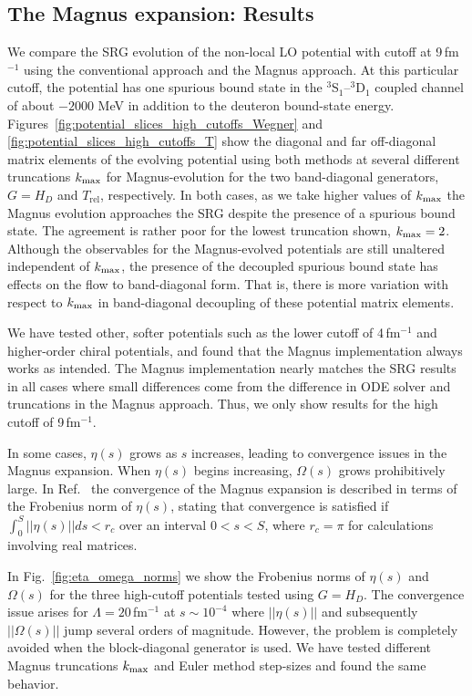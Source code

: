 \documentclass[10pt,aps,prc,floatfix,twocolumn,nofootinbib]{revtex4-1}
\newcommand{\Trel}{\ensuremath{T_{\textrm{rel}}}}
\begin{document}
\subsection{The Magnus expansion: Results}
\label{sec:magnus_expansion_results}


We compare the SRG evolution of the non-local LO potential with cutoff at 9\,fm$^{-1}$ using the conventional approach and the Magnus approach.
At this particular cutoff, the potential has one spurious bound state in the $^3$S$_1$--$^3$D$_1$ coupled channel of about $-2000$ MeV in addition to the deuteron bound-state energy. 
Figures~\ref{fig:potential_slices_high_cutoffs_Wegner} and \ref{fig:potential_slices_high_cutoffs_T} show the diagonal and far off-diagonal matrix elements of the evolving potential using both methods at several different truncations $k_{\rm max}$ for Magnus-evolution for the two band-diagonal generators, $G=H_D$ and \Trel, respectively.
In both cases, as we take higher values of $k_{\rm max}$ the Magnus evolution approaches the SRG despite the presence of a spurious bound state.
The agreement is rather poor for the lowest truncation shown, $k_{\rm max}=2$.
Although the observables for the Magnus-evolved potentials are still unaltered independent of $k_{\rm max}$, the presence of the decoupled spurious bound state has effects on the flow to band-diagonal form.
That is, there is more variation with respect to $k_{\rm max}$ in band-diagonal decoupling of these potential matrix elements.


We have tested other, softer potentials such as the lower cutoff of 4\,fm$^{-1}$ and higher-order chiral potentials, and found that the Magnus implementation always works as intended.
The Magnus implementation nearly matches the SRG results in all cases where small differences come from the difference in ODE solver and truncations in the Magnus approach.
Thus, we only show results for the high cutoff of 9\,fm$^{-1}$.


In some cases, $\eta(s)$ grows as $s$ increases, leading to convergence issues in the Magnus expansion.
When $\eta(s)$ begins increasing, $\Omega(s)$ grows prohibitively large.
In Ref.~\cite{Blanes:2009ab} the convergence of the Magnus expansion is described in terms of the Frobenius norm of $\eta(s)$, stating that convergence is satisfied if $\int_0^S ||\eta(s)|| ds < r_c$ over an interval $0 < s < S$, where $r_c = \pi$ for calculations involving real matrices. 


In Fig.~\ref{fig:eta_omega_norms} we show the Frobenius norms of $\eta(s)$ and $\Omega(s)$ for the three high-cutoff potentials tested using $G=H_D$.
The convergence issue arises for $\Lambda=20$\,fm$^{-1}$ at $s \sim 10^{-4}$ where $||\eta(s)||$ and subsequently $||\Omega(s)||$ jump several orders of magnitude.
However, the problem is completely avoided when the block-diagonal generator is used.
We have tested different Magnus truncations $k_{\rm max}$ and Euler method step-sizes and found the same behavior.
\end{document}
